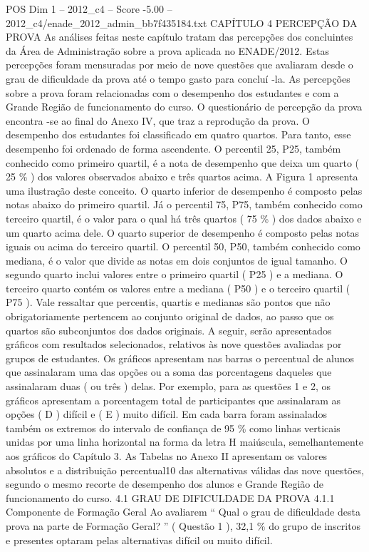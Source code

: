 \begin{textsample}{POS Dim 1 – 2012\_c4 – Score -5.00 – 2012\_c4/enade\_2012\_admin\_bb7f435184.txt}  \label{ex:f1_pos_367}
CAPÍTULO 4 PERCEPÇÃO DA PROVA As análises feitas neste capítulo tratam das percepções dos concluintes da Área de Administração sobre a prova aplicada no ENADE/2012.
Estas percepções foram mensuradas por meio de nove questões que avaliaram desde o grau de dificuldade da prova até o tempo gasto para concluí -la.
As percepções sobre a prova foram relacionadas com o desempenho dos estudantes e com a Grande Região de funcionamento do curso.
O questionário de percepção da prova encontra -se ao final do Anexo IV, que traz a reprodução da prova.
O desempenho dos estudantes foi classificado em quatro quartos.
Para tanto, esse desempenho foi ordenado de forma ascendente.
O percentil 25, P25, também conhecido como primeiro quartil, é a nota de desempenho que deixa um quarto ( 25 \% ) dos valores observados abaixo e três quartos acima.
A Figura 1 apresenta uma ilustração deste conceito.
O quarto inferior de desempenho é composto pelas notas abaixo do primeiro quartil.
Já o percentil 75, P75, também conhecido como terceiro quartil, é o valor para o qual há três quartos ( 75 \% ) dos dados abaixo e um quarto acima dele.
O quarto superior de desempenho é composto pelas notas iguais ou acima do terceiro quartil.
O percentil 50, P50, também conhecido como mediana, é o valor que divide as notas em dois conjuntos de igual tamanho.
O segundo quarto inclui valores entre o primeiro quartil ( P25 ) e a mediana.
O terceiro quarto contém os valores entre a mediana ( P50 ) e o terceiro quartil ( P75 ).
Vale ressaltar que percentis, quartis e medianas são pontos que não obrigatoriamente pertencem ao conjunto original de dados, ao passo que os quartos são subconjuntos dos dados originais.
A seguir, serão apresentados gráficos com resultados selecionados, relativos às nove questões avaliadas por grupos de estudantes.
Os gráficos apresentam nas barras o percentual de alunos que assinalaram uma das opções ou a soma das porcentagens daqueles que assinalaram duas ( ou três ) delas.
Por exemplo, para as questões 1 e 2, os gráficos apresentam a porcentagem total de participantes que assinalaram as opções ( D ) difícil e ( E ) muito difícil.
Em cada barra foram assinalados também os extremos do intervalo de confiança de 95 \% como linhas verticais unidas por uma linha horizontal na forma da letra H maiúscula, semelhantemente aos gráficos do Capítulo 3.
As Tabelas no Anexo II apresentam os valores absolutos e a distribuição percentual10 das alternativas válidas das nove questões, segundo o mesmo recorte de desempenho dos alunos e Grande Região de funcionamento do curso. 4.1 GRAU DE DIFICULDADE DA PROVA 4.1.1 Componente de Formação Geral Ao avaliarem “ Qual o grau de dificuldade desta prova na parte de Formação Geral? ” ( Questão 1 ), 32,1 \% do grupo de inscritos e presentes optaram pelas alternativas difícil ou muito difícil.

\end{textsample}
